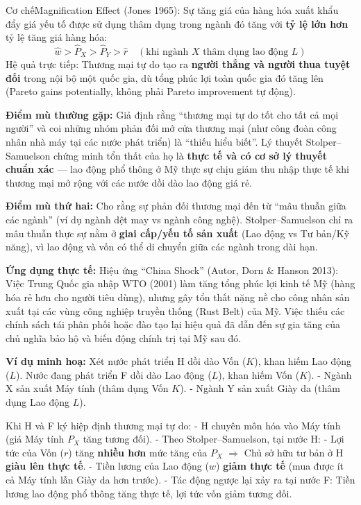 \documentclass[
]{article}
\begin{document}
Cơ chếMagnification Effect (Jones 1965): Sự tăng giá của hàng hóa xuất
khẩu đẩy giá yếu tố được sử dụng thâm dụng trong ngành đó tăng với
\textbf{tỷ lệ lớn hơn} tỷ lệ tăng giá hàng hóa:
\[ \hat{w} > \hat{P}_X > \hat{P}_Y > \hat{r} \quad (\text{khi ngành } X \text{ thâm dụng lao động } L) \]
Hệ quả trực tiếp: Thương mại tự do tạo ra \textbf{người thắng và người
thua tuyệt đối} trong nội bộ một quốc gia, dù tổng phúc lợi toàn quốc
gia đó tăng lên (Pareto gains potentially, không phải Pareto improvement
tự động).

\textbf{Điểm mù thường gặp:} Giả định rằng ``thương mại tự do tốt cho
tất cả mọi người'' và coi những nhóm phản đối mở cửa thương mại (như
công đoàn công nhân nhà máy tại các nước phát triển) là ``thiếu hiểu
biết''. Lý thuyết Stolper--Samuelson chứng minh tổn thất của họ là
\textbf{thực tế và có cơ sở lý thuyết chuẩn xác} --- lao động phổ thông
ở Mỹ thực sự chịu giảm thu nhập thực tế khi thương mại mở rộng với các
nước dồi dào lao động giá rẻ.

\textbf{Điểm mù thứ hai:} Cho rằng sự phản đối thương mại đến từ ``mâu
thuẫn giữa các ngành'' (ví dụ ngành dệt may vs ngành công nghệ).
Stolper--Samuelson chỉ ra mâu thuẫn thực sự nằm ở \textbf{giai cấp/yếu
tố sản xuất} (Lao động vs Tư bản/Kỹ năng), vì lao động và vốn có thể di
chuyển giữa các ngành trong dài hạn.

\textbf{Ứng dụng thực tế:} Hiệu ứng ``China Shock'' (Autor, Dorn \&
Hanson 2013): Việc Trung Quốc gia nhập WTO (2001) làm tăng tổng phúc lợi
kinh tế Mỹ (hàng hóa rẻ hơn cho người tiêu dùng), nhưng gây tổn thất
nặng nề cho công nhân sản xuất tại các vùng công nghiệp truyền thống
(Rust Belt) của Mỹ. Việc thiếu các chính sách tái phân phối hoặc đào tạo
lại hiệu quả đã dẫn đến sự gia tăng của chủ nghĩa bảo hộ và biến động
chính trị tại Mỹ sau đó.

\textbf{Ví dụ minh hoạ:} Xét nước phát triển H dồi dào Vốn (\(K\)), khan
hiếm Lao động (\(L\)). Nước đang phát triển F dồi dào Lao động (\(L\)),
khan hiếm Vốn (\(K\)). - Ngành X sản xuất Máy tính (thâm dụng Vốn
\(K\)). - Ngành Y sản xuất Giày da (thâm dụng Lao động \(L\)).

Khi H và F ký hiệp định thương mại tự do: - H chuyên môn hóa vào Máy
tính (giá Máy tính \(P_X\) tăng tương đối). - Theo Stolper--Samuelson,
tại nước H: - Lợi tức của Vốn (\(r\)) tăng \textbf{nhiều hơn} mức tăng
của \(P_X\) \(\Rightarrow\) Chủ sở hữu tư bản ở H \textbf{giàu lên thực
tế}. - Tiền lương của Lao động (\(w\)) \textbf{giảm thực tế} (mua được
ít cả Máy tính lẫn Giày da hơn trước). - Tác động ngược lại xảy ra tại
nước F: Tiền lương lao động phổ thông tăng thực tế, lợi tức vốn giảm
tương đối.
\end{document}
